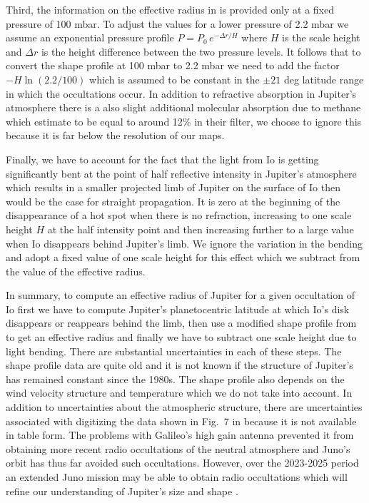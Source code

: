 \documentclass[linenumbers,modern]{aastex62}
\begin{document}
%

Third, the information on the effective radius in \cite{lindal1981} is provided only at a fixed pressure of 100 mbar.
To adjust the values for a lower pressure of 2.2 mbar we assume an exponential pressure profile $P=P_0\, e^{-\Delta r/H}$ where $H$ is the scale height and $\Delta r$ is the height difference between the two pressure levels.
It follows that to convert the shape profile at 100 mbar to 2.2 mbar we need to add the factor
$-H\ln(2.2/100)$ which is assumed to be constant in the $\pm 21$ deg latitude range in which the occultations occur.
In addition to refractive absorption in Jupiter's atmosphere there is a also slight additional molecular absorption due to methane which \cite{spencer1990} estimate to be equal to around 12\% in their filter, we choose to ignore this because it is far below the resolution of our maps.

Finally, we have to account for the fact that the light from Io is getting significantly bent at the point of half reflective intensity in Jupiter's atmosphere which results in a smaller projected limb of Jupiter on the surface of Io then would be the case for straight propagation.
It is zero at the beginning of the disappearance of a hot spot when there is no refraction, increasing to one scale height $H$ at the half intensity point and then increasing further to a large value when Io disappears behind Jupiter's limb.
We ignore the variation in the bending and adopt a fixed value of one scale height for this effect which we subtract from the value of the effective radius.

In summary, to compute an effective radius of Jupiter for a given occultation of Io first we have to compute Jupiter's planetocentric latitude at which Io's disk disappears or reappears behind the limb, then use a modified shape profile from \cite{lindal1981} to get an effective radius and finally we have to subtract one scale height due to light bending.
There are substantial uncertainties in each of these steps.
The shape profile data are quite old and it is not known if the structure of Jupiter's has remained constant since the 1980s. 
The shape profile also depends on the wind velocity structure and temperature which we do not take into account.
In addition to uncertainties about the atmospheric structure, there are uncertainties associated with digitizing the data shown in Fig.~7 in \cite{lindal1981} because it is not available in table form.
The problems with Galileo's high gain antenna prevented it from obtaining more recent radio occultations of the neutral atmosphere and Juno's orbit has thus far avoided such occultations.  
However, over the 2023-2025 period an extended Juno mission may be able to obtain radio occultations which will refine our understanding of Jupiter's size and shape \citep{hodges2020}.
\end{document}
